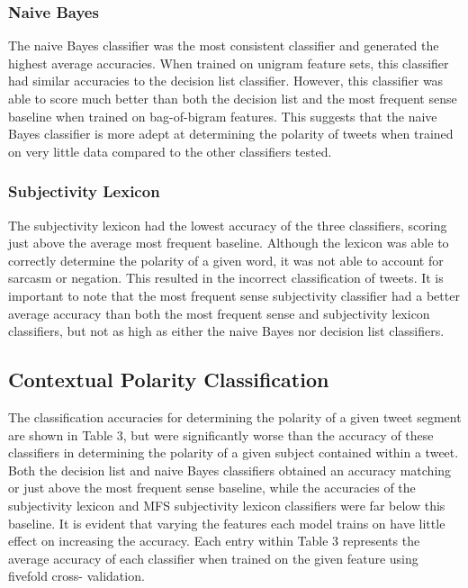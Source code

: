 \documentclass[11pt]{article}
\begin{document}
\subsubsection*{Naive Bayes}
The naive Bayes classifier was the most consistent classifier and generated the highest average accuracies. When trained on unigram feature sets, this classifier had similar accuracies to the decision list classifier. However, this classifier was able to score much better than both the decision list and the most frequent sense baseline when trained on bag-of-bigram features. This suggests that the naive Bayes classifier is more adept at determining the polarity of tweets when trained on very little data compared to the other classifiers tested.

\subsubsection*{Subjectivity Lexicon}
The subjectivity lexicon had the lowest accuracy of the three classifiers, scoring just above the average most frequent baseline. Although the lexicon was able to correctly determine the polarity of a given word, it was not able to account for sarcasm or negation. This resulted in the incorrect classification of tweets. It is important to note that the most frequent sense subjectivity classifier had a better average accuracy than both the most frequent sense and subjectivity lexicon classifiers, but not as high as either the naive Bayes nor decision list classifiers. 

\subsection{Contextual Polarity Classification}
The classification accuracies for determining the polarity of a given tweet segment are shown in Table 3, but were significantly worse than the accuracy of these classifiers in determining the polarity of a given subject contained within a tweet. Both the decision list and naive Bayes classifiers obtained an accuracy matching or just above the most frequent sense baseline, while the accuracies of the subjectivity lexicon and MFS subjectivity lexicon classifiers were far below this baseline. It is evident that varying the features each model trains on have little effect on increasing the accuracy. Each entry within Table 3 represents the average accuracy of each classifier when trained on the given feature using fivefold cross- validation.
\end{document}
